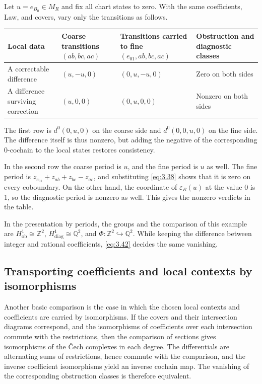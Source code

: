 \begin{example}\label{ex:3.45}

Let $u=e_{B_0}\in M_R$ and fix all chart states to zero.
With the same coefficients, Law, and covers, vary only the transitions as follows.

\begin{xltabular}{\linewidth}{@{}LLLL@{}}
\toprule
Local data & Coarse transitions $(ab,bc,ac)$ & Transitions carried to fine $(e_{01},ab,bc,ac)$ & Obstruction and diagnostic classes \\
\midrule
\endhead
A correctable difference & $(u,-u,0)$ & $(0,u,-u,0)$ & Zero on both sides \\
\addlinespace[3pt]
A difference surviving correction & $(u,0,0)$ & $(0,u,0,0)$ & Nonzero on both sides \\
\bottomrule
\end{xltabular}

The first row is $d^0(0,u,0)$ on the coarse side and
$d^0(0,0,u,0)$ on the fine side.
The difference itself is thus nonzero, but adding the negative of the corresponding
0-cochain to the local states restores consistency.

In the second row the coarse period is $u$, and the fine period is $u$ as well.
The fine period is
$z_{e_{01}}+z_{ab}+z_{bc}-z_{ac}$, and substituting \eqref{eq:3.38} shows that it is
zero on every coboundary.
On the other hand, the coordinate of $\varepsilon_R(u)$ at the value 0 is 1, so the
diagnostic period is nonzero as well.
This gives the nonzero verdicts in the table.

In the presentation by periods, the groups and the comparison of this example are
$H^1_{\mathrm{ob}}\cong\mathbb{Z}^2$, $H^1_{\mathrm{diag}}\cong\mathbb{Q}^2$, and
$\Phi:\mathbb{Z}^2\hookrightarrow\mathbb{Q}^2$.
While keeping the difference between integer and rational coefficients,
\eqref{eq:3.42} decides the same vanishing.

\end{example}

\subsection*{Transporting coefficients and local contexts by isomorphisms}

Another basic comparison is the case in which the chosen local contexts and
coefficients are carried by isomorphisms.
If the covers and their intersection diagrams correspond, and the isomorphisms of
coefficients over each intersection commute with the restrictions, then the
comparison of sections gives isomorphisms of the \v{C}ech complexes in each degree.
The differentials are alternating sums of restrictions, hence commute with the
comparison, and the inverse coefficient isomorphisms yield an inverse cochain map.
The vanishing of the corresponding obstruction classes is therefore equivalent.

